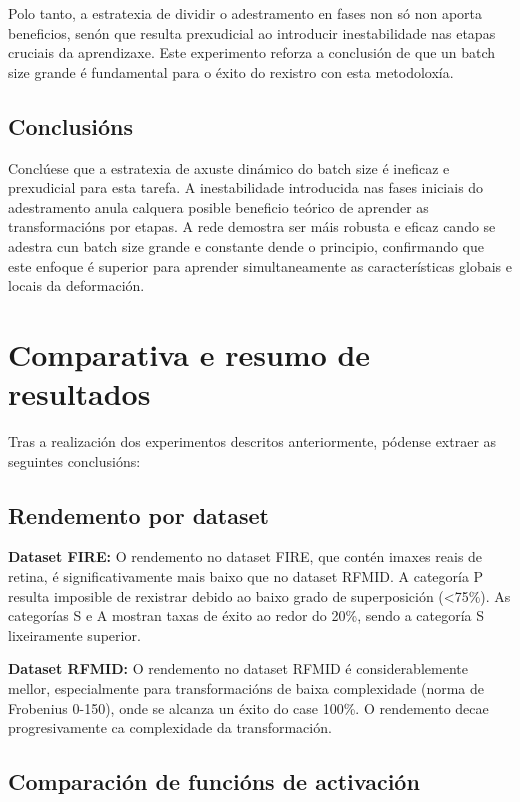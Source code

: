 Polo tanto, a estratexia de dividir o adestramento en fases non só non aporta beneficios, senón que resulta prexudicial ao introducir inestabilidade nas etapas cruciais da aprendizaxe. Este experimento reforza a conclusión de que un batch size grande é fundamental para o éxito do rexistro con esta metodoloxía.

\subsection{Conclusións}
\label{subsec:Conclusions-phases}

Conclúese que a estratexia de axuste dinámico do batch size é ineficaz e prexudicial para esta tarefa. A inestabilidade introducida nas fases iniciais do adestramento anula calquera posible beneficio teórico de aprender as transformacións por etapas. A rede demostra ser máis robusta e eficaz cando se adestra cun batch size grande e constante dende o principio, confirmando que este enfoque é superior para aprender simultaneamente as características globais e locais da deformación.


\section{Comparativa e resumo de resultados}
\label{sec:Comparativa e resumo}

Tras a realización dos experimentos descritos anteriormente, pódense extraer as seguintes conclusións:

\subsection{Rendemento por dataset}
\label{subsec:Rendemento por dataset}

\textbf{Dataset FIRE:} O rendemento no dataset FIRE, que contén imaxes reais de retina, é significativamente mais baixo que no dataset RFMID. A categoría P resulta imposible de rexistrar debido ao baixo grado de superposición (<75\%). As categorías S e A mostran taxas de éxito ao redor do 20\%, sendo a categoría S lixeiramente superior.

\textbf{Dataset RFMID:} O rendemento no dataset RFMID é considerablemente mellor, especialmente para transformacións de baixa complexidade (norma de Frobenius 0-150), onde se alcanza un éxito do case 100\%. O rendemento decae progresivamente ca complexidade da transformación. 
\subsection{Comparación de funcións de activación}
\label{subsec:Comparación de funcións de activación}

